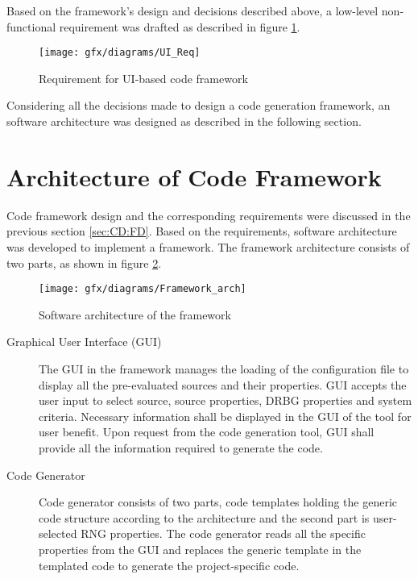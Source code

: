 Based on the framework's design and decisions described above, a low-level non-functional requirement was drafted as described in figure \ref{fig:4:13}.

\begin{figure}[!h]
	\centering
	\texttt{[image: gfx/diagrams/UI\_Req]}
	\caption{Requirement for UI-based code framework}
	\label{fig:4:13}
\end{figure}

Considering all the decisions made to design a code generation framework, an software architecture was designed as described in the following section.


%
%
\section{Architecture of Code Framework}
\label{sec:CD:ACF}
Code framework design and the corresponding requirements were discussed in the previous section \ref{sec:CD:FD}. Based on the requirements, software architecture was developed to implement a framework. The framework architecture consists of two parts, as shown in figure \ref{fig:4:14}. 

\begin{figure}[!h]
	\centering
	\texttt{[image: gfx/diagrams/Framework\_arch]}
	\caption{Software architecture of the framework}
	\label{fig:4:14}
\end{figure}
\begin{description}
	\item[Graphical User Interface (GUI)] The GUI in the framework manages the loading of the configuration file to display all the pre-evaluated sources and their properties. GUI accepts the user input to select source, source properties, DRBG properties and system criteria. Necessary information shall be displayed in the GUI of the tool for user benefit. Upon request from the code generation tool, GUI shall provide all the information required to generate the code.
	
	\item[Code Generator] Code generator consists of two parts, code templates holding the generic code structure according to the architecture and the second part is user-selected RNG properties. The code generator reads all the specific properties from the GUI and replaces the generic template in the templated code to generate the project-specific code.
	
\end{description}

